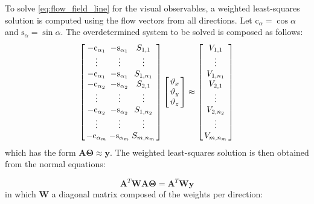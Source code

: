 To solve \cref{eq:flow_field_line} for the visual observables, a weighted least-squares solution is computed using the flow vectors from all directions. Let $\mathrm{c}_\alpha=\cos\alpha$ and $\mathrm{s}_\alpha=\sin\alpha$. The overdetermined system to be solved is composed as follows:
\begin{equation}
\label{eq:dir_flow_field_system}
\arraycolsep=1.4pt
\left[ {\begin{array}{*{20}{c}}
	{ - {\rm{c}}_{\alpha _1}}&{ - {\rm{s}}_{\alpha _1}}&{{S_{1,1}}}\\
	\vdots & \vdots & \vdots \\
	{ - {\rm{c}}_{\alpha _1}}&{ - {\rm{s}}_{\alpha _1}}&{{S_{1,{n_1}}}}\\
	{ - {\rm{c}}_{\alpha _2}}&{ - {\rm{s}}_{\alpha _2}}&{{S_{2,1}}}\\
	\vdots & \vdots & \vdots \\
	{ - {\rm{c}}_{\alpha _2}}&{ - {\rm{s}}_{\alpha _2}}&{{S_{1,{n_2}}}}\\
	\vdots & \vdots & \vdots \\
	{ - {\rm{c}}_{\alpha _m}}&{ - {\rm{s}}_{\alpha _m}}&{{S_{m,{n_m}}}}
	\end{array}} \right]\left[ {\begin{array}{*{20}{c}}
	{{\vartheta _x}}\\
	{{\vartheta _y}}\\
	{{\vartheta _z}}
	\end{array}} \right] \approx \left[ {\begin{array}{*{20}{c}}
	{{V_{1,1}}}\\
	\vdots \\
	{{V_{1,{n_1}}}}\\
	{{V_{2,1}}}\\
	\vdots \\
	{{V_{2,{n_2}}}}\\
	\vdots \\
	{{V_{m,{n_m}}}}
	\end{array}} \right]
\end{equation}
which has the form $\mathbf{A\Theta}\approx\mathbf{y}$. The weighted least-squares solution is then obtained from the normal equations:

\begin{equation}
\label{eq:weighted_least_squares}
\mathbf{A}^T\mathbf{W}\mathbf{A}\mathbf{\Theta}=\mathbf{A}^T \mathbf{Wy}
\end{equation} 
in which $\mathbf{W}$ a diagonal matrix composed of the weights per direction:

